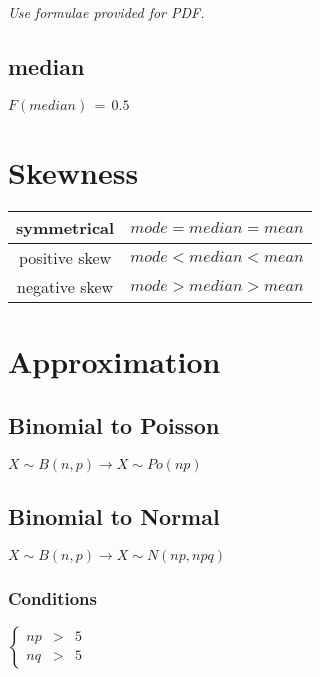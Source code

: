 \documentclass[a4paper,9pt]{scrartcl}
\begin{document}
    \textit{Use formulae provided for PDF.}

    \subsection{median}

    \begin{math}
        F(median)\,=\,0.5
    \end{math}


    \section{Skewness}

    \begin{tabular}{|c|c|}
        \hline symmetrical   & $mode = median = mean$ \\
        \hline positive skew & $mode < median < mean$ \\
        \hline negative skew & $mode > median > mean$ \\
        \hline
    \end{tabular}


    \section{Approximation}

    \subsection{Binomial to Poisson}

    \begin{math}
        X {\sim} B(n,p) \longrightarrow X {\sim} Po(np)
    \end{math}

    \subsection{Binomial to Normal}

    \begin{math}
        X {\sim} B(n,p) \longrightarrow X {\sim} N(np, npq)
    \end{math}

    \subsubsection{Conditions}

    \begin{math}
        \left\{
        \begin{matrix}
            np &>& 5 \\
            nq &>& 5
        \end{matrix}
        \right.
    \end{math}
\end{document}
